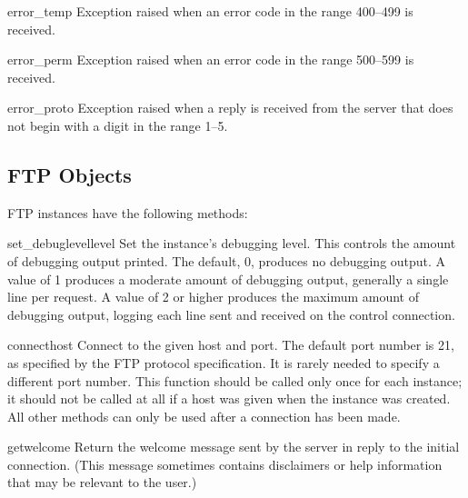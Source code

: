\begin{excdesc}{error_temp}
Exception raised when an error code in the range 400--499 is received.
\end{excdesc}

\begin{excdesc}{error_perm}
Exception raised when an error code in the range 500--599 is received.
\end{excdesc}

\begin{excdesc}{error_proto}
Exception raised when a reply is received from the server that does
not begin with a digit in the range 1--5.
\end{excdesc}

\subsection{FTP Objects}

FTP instances have the following methods:


\begin{funcdesc}{set_debuglevel}{level}
Set the instance's debugging level.  This controls the amount of
debugging output printed.  The default, 0, produces no debugging
output.  A value of 1 produces a moderate amount of debugging output,
generally a single line per request.  A value of 2 or higher produces
the maximum amount of debugging output, logging each line sent and
received on the control connection.
\end{funcdesc}

\begin{funcdesc}{connect}{host}
Connect to the given host and port.  The default port number is 21, as
specified by the FTP protocol specification.  It is rarely needed to
specify a different port number.  This function should be called only
once for each instance; it should not be called at all if a host was
given when the instance was created.  All other methods can only be
used after a connection has been made.
\end{funcdesc}

\begin{funcdesc}{getwelcome}{}
Return the welcome message sent by the server in reply to the initial
connection.  (This message sometimes contains disclaimers or help
information that may be relevant to the user.)
\end{funcdesc}

